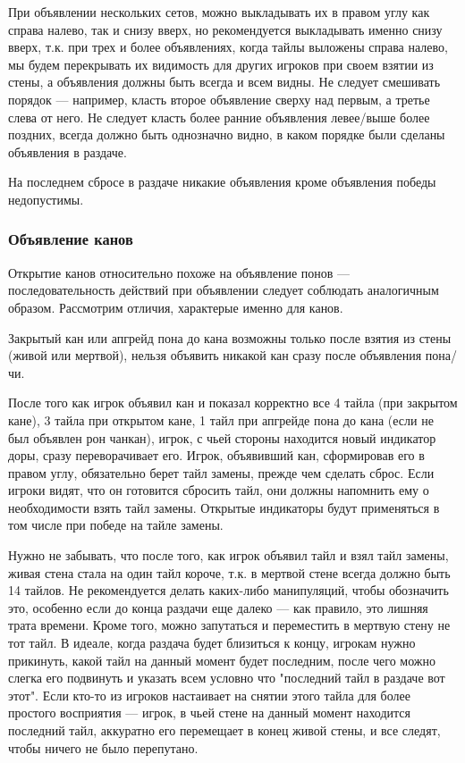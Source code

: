 При объявлении нескольких сетов, можно выкладывать их в правом углу как справа налево, так и снизу вверх, но рекомендуется выкладывать именно снизу вверх, т.к. при трех и более объявлениях, когда тайлы выложены справа налево, мы будем перекрывать их видимость для других игроков при своем взятии из стены, а объявления должны быть всегда и всем видны. Не следует смешивать порядок --- например, класть второе объявление сверху над первым, а третье слева от него. Не следует класть более ранние объявления левее/выше более поздних, всегда должно быть однозначно видно, в каком порядке были сделаны объявления в раздаче.

На последнем сбросе в раздаче никакие объявления кроме объявления победы недопустимы.

\subsubsection{Объявление канов}

Открытие канов относительно похоже на объявление понов --- последовательность действий при объявлении следует соблюдать аналогичным образом. Рассмотрим отличия, характерые именно для канов.

Закрытый кан или апгрейд пона до кана возможны только после взятия из стены (живой или мертвой), нельзя объявить никакой кан сразу после объявления пона/чи.

После того как игрок объявил кан и показал корректно все 4 тайла (при закрытом кане), 3 тайла при открытом кане, 1 тайл при апгрейде пона до кана (если не был объявлен рон чанкан), игрок, с чьей стороны находится новый индикатор доры, сразу переворачивает его. Игрок, объявивший кан, сформировав его в правом углу, обязательно берет тайл замены, прежде чем сделать сброс. Если игроки видят, что он готовится сбросить тайл, они должны напомнить ему о необходимости взять тайл замены. Открытые индикаторы будут применяться в том числе при победе на тайле замены.

Нужно не забывать, что после того, как игрок объявил тайл и взял тайл замены, живая стена стала на один тайл короче, т.к. в мертвой стене всегда должно быть 14 тайлов. Не рекомендуется делать каких-либо манипуляций, чтобы обозначить это, особенно если до конца раздачи еще далеко --- как правило, это лишняя трата времени. Кроме того, можно запутаться и переместить в мертвую стену не тот тайл. В идеале, когда раздача будет близиться к концу, игрокам нужно прикинуть, какой тайл на данный момент будет последним, после чего можно слегка его подвинуть и указать всем условно что "последний тайл в раздаче вот этот". Если кто-то из игроков настаивает на снятии этого тайла для более простого восприятия --- игрок, в чьей стене на данный момент находится последний тайл, аккуратно его перемещает в конец живой стены, и все следят, чтобы ничего не было перепутано.

